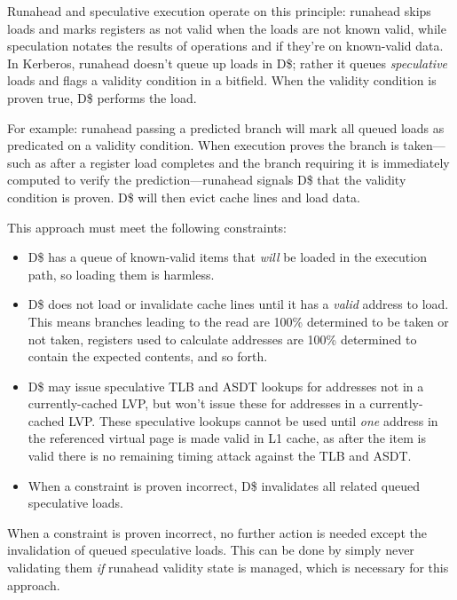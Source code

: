 Runahead and speculative execution operate on this principle:  runahead skips
loads and marks registers as not valid when the loads are not known valid,
while speculation notates the results of operations and if they're on
known-valid data.  In Kerberos, runahead doesn't queue up loads in D\$; rather
it queues {\em speculative} loads and flags a validity condition in a bitfield.
When the validity condition is proven true, D\$ performs the load.

For example:  runahead passing a predicted branch will mark all queued loads as
predicated on a validity condition.  When execution proves the branch is
taken—such as after a register load completes and the branch requiring it is
immediately computed to verify the prediction—runahead signals D\$ that the
validity condition is proven.  D\$ will then evict cache lines and load data.

This approach must meet the following constraints:

\begin{itemize}

    \item D\$ has a queue of known-valid items that {\em will} be loaded in the
        execution path, so loading them is harmless.

    \item D\$ does not load or invalidate cache lines until it has a {\em
        valid} address to load.  This means branches leading to the read are
        100\% determined to be taken or not taken, registers used to calculate
        addresses are 100\% determined to contain the expected contents, and so
        forth.

    \item D\$ may issue speculative TLB and ASDT lookups for addresses not in a
        currently-cached LVP, but won't issue these for addresses in a
        currently-cached LVP.  These speculative lookups cannot be used until
        {\em one} address in the referenced virtual page is made valid in L1
        cache, as after the item is valid there is no remaining timing attack
        against the TLB and ASDT.

    \item When a constraint is proven incorrect, D\$ invalidates all related
        queued speculative loads.
\end{itemize}

When a constraint is proven incorrect, no further action is needed except the invalidation of queued speculative loads.  This can be done by simply never validating them {\em if} runahead validity state is managed, which is necessary for this approach.

